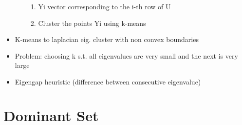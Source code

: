 \begin{itemize}
\begin{itemize}
\begin{enumerate}
            \item  Yi vector corresponding to the i-th row of U
            \item Cluster the points Yi using k-means
        \end{enumerate}
    \end{itemize}
    \item K-means to laplacian eig. cluster with non convex boundaries
    \item Problem: choosing k s.t. all eigenvalues are very small and the next is very large
    \item Eigengap heuristic (difference between consecutive eigenvalue)
\end{itemize}

\chapter{Dominant Set}
